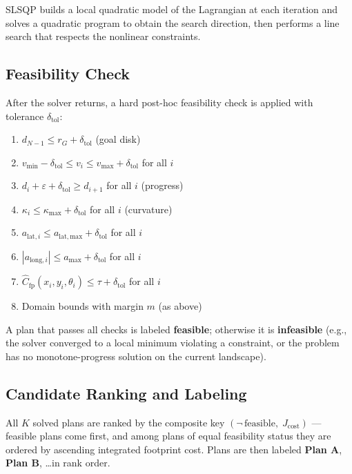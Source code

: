 \documentclass[11pt,a4paper]{article}
\begin{document}
SLSQP builds a local quadratic model of the Lagrangian at each iteration and
solves a quadratic program to obtain the search direction, then performs a
line search that respects the nonlinear constraints.

\subsection{Feasibility Check}

After the solver returns, a hard post-hoc feasibility check is applied with
tolerance $\delta_{\mathrm{tol}}$:

\begin{enumerate}[label=(\alph*)]
  \item $d_{N-1} \le r_G + \delta_{\mathrm{tol}}$ \quad (goal disk)
  \item $v_{\min} - \delta_{\mathrm{tol}} \le v_i \le v_{\max} + \delta_{\mathrm{tol}}$ for all $i$
  \item $d_i + \varepsilon + \delta_{\mathrm{tol}} \ge d_{i+1}$ for all $i$ \quad (progress)
  \item $\kappa_i \le \kappa_{\max} + \delta_{\mathrm{tol}}$ for all $i$ \quad (curvature)
  \item $a_{\mathrm{lat},i} \le a_{\mathrm{lat,max}} + \delta_{\mathrm{tol}}$ for all $i$
  \item $|a_{\mathrm{long},i}| \le a_{\max} + \delta_{\mathrm{tol}}$ for all $i$
  \item $\hat{C}_{\mathrm{fp}}(x_i, y_i, \theta_i) \le \tau + \delta_{\mathrm{tol}}$ for all $i$
  \item Domain bounds with margin $m$ (as above)
\end{enumerate}

A plan that passes all checks is labeled \textbf{feasible}; otherwise it is
\textbf{infeasible} (e.g., the solver converged to a local minimum violating a
constraint, or the problem has no monotone-progress solution on the current
landscape).

\subsection{Candidate Ranking and Labeling}

All $K$ solved plans are ranked by the composite key
$(\neg\,\mathrm{feasible},\; J_{\mathrm{cost}})$ --- feasible plans come first,
and among plans of equal feasibility status they are ordered by ascending
integrated footprint cost.
Plans are then labeled \textbf{Plan A}, \textbf{Plan B}, \ldots in rank order.
\end{document}
